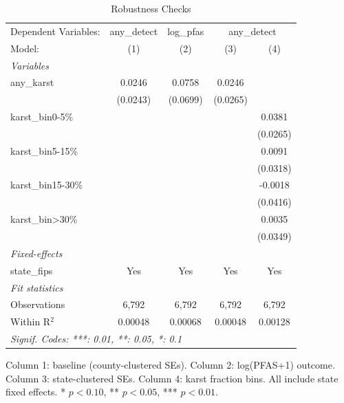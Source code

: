 
\begin{table}[htbp]
   \caption{\label{tab:robust} Robustness Checks}
   \centering
   \begin{tabular}{lcccc}
      \tabularnewline \midrule \midrule
      Dependent Variables: & any\_detect & log\_pfas & \multicolumn{2}{c}{any\_detect}\\
      Model:              & (1)      & (2)      & (3)      & (4)\\  
      \midrule
      \emph{Variables}\\
      any\_karst          & 0.0246   & 0.0758   & 0.0246   &   \\   
                          & (0.0243) & (0.0699) & (0.0265) &   \\   
      karst\_bin0-5\%     &          &          &          & 0.0381\\   
                          &          &          &          & (0.0265)\\   
      karst\_bin5-15\%    &          &          &          & 0.0091\\   
                          &          &          &          & (0.0318)\\   
      karst\_bin15-30\%   &          &          &          & -0.0018\\   
                          &          &          &          & (0.0416)\\   
      karst\_bin>30\%     &          &          &          & 0.0035\\   
                          &          &          &          & (0.0349)\\   
      \midrule
      \emph{Fixed-effects}\\
      state\_fips         & Yes      & Yes      & Yes      & Yes\\  
      \midrule
      \emph{Fit statistics}\\
      Observations        & 6,792    & 6,792    & 6,792    & 6,792\\  
      Within R$^2$        & 0.00048  & 0.00068  & 0.00048  & 0.00128\\  
      \midrule \midrule
      \multicolumn{5}{l}{\emph{Signif. Codes: ***: 0.01, **: 0.05, *: 0.1}}\\
   \end{tabular}
   
   \par \raggedright 
   Column 1: baseline (county-clustered SEs). Column 2: log(PFAS+1) outcome. Column 3: state-clustered SEs. Column 4: karst fraction bins. All include state fixed effects. * $p<0.10$, ** $p<0.05$, *** $p<0.01$.
\end{table}


